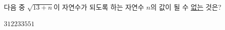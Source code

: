 다음 중 $\sqrt{13+n}$이 자연수가 되도록 하는 자연수 $n$의 값이 될 수 \underline{없는} 것은?
\begin{choices32}{$3$}{$12$}{$23$}{$35$}{$51$}\end{choices32}
